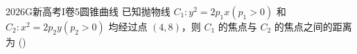 
\begin{problem}{2026}{G}{新高考I卷}{5}{圆锥曲线}
已知抛物线 $ C_1:y^2=2p_1x(p_1>0) $ 和 $ C_2:x^2=2p_2y(p_2>0) $ 均经过点 $ (4,8) $，则 $ C_1 $ 的焦点与 $ C_2 $ 的焦点之间的距离为 (\hspace{1cm})
\begin{choices}
\end{choices}
\end{problem}

\begin{answer}
\end{answer}

\begin{solutions}
\end{solutions}